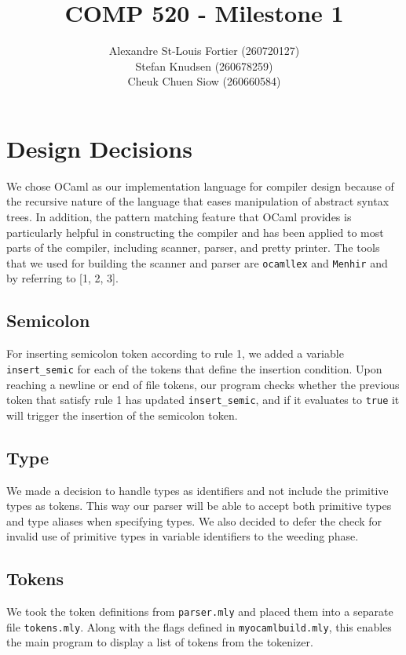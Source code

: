 \documentclass{article}
\begin{document}
\pagestyle{empty}

\title{COMP 520 - Milestone 1}
\author{
Alexandre St-Louis Fortier (260720127)\\
Stefan Knudsen (260678259)\\
Cheuk Chuen Siow (260660584)}
\maketitle

\raggedright
\section*{Design Decisions}
We chose OCaml as our implementation language for compiler design because of the recursive nature of the language that eases manipulation of abstract syntax trees. In addition, the pattern matching feature that OCaml provides is particularly helpful in constructing the compiler and has been applied to most parts of the compiler, including scanner, parser, and pretty printer. The tools that we used for building the scanner and parser are \verb|ocamllex| and \verb|Menhir| and by referring to [1, 2, 3].

\subsection*{Semicolon}
For inserting semicolon token according to rule 1, we added a variable \verb|insert_semic| for each of the tokens that define the insertion condition. Upon reaching a newline or end of file tokens, our program checks whether the previous token that satisfy rule 1 has updated \verb|insert_semic|, and if it evaluates to \verb|true| it will trigger the insertion of the semicolon token.

\subsection*{Type}
We made a decision to handle types as identifiers and not include the primitive types as tokens. This way our parser will be able to accept both primitive types and type aliases when specifying types. We also decided to defer the check for invalid use of primitive types in variable identifiers to the weeding phase.

\subsection*{Tokens}
We took the token definitions from \verb|parser.mly| and placed them into a separate file \verb|tokens.mly|. Along with the flags defined in \verb|myocamlbuild.mly|, this enables the main program to display a list of tokens from the tokenizer.
\end{document}
